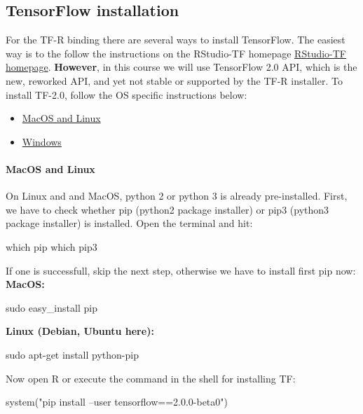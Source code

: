 \documentclass[a4paper,twoside]{tufte-book}\usepackage[]{graphicx}\usepackage[]{color}
\begin{document}
\subsection{TensorFlow installation}
For the TF-R binding there are several ways to install TensorFlow. 
%
The easiest way is to the follow the instructions on the RStudio-TF homepage \href{https://tensorflow.rstudio.com/tensorflow/articles/installation.html}{RStudio-TF homepage}.
%
\textbf{However}, in this course we will use TensorFlow 2.0 API, which is the new, reworked API, and yet not stable or supported by the TF-R installer.   
%
To install TF-2.0, follow the OS specific instructions below:
%
\begin{itemize}
\item \hyperref[Mac]{MacOS and Linux}
\item \hyperref[Windows]{Windows}
\end{itemize}

\paragraph{MacOS and Linux}\label{Mac} 
On Linux and and MacOS, python 2 or python 3 is already pre-installed.
%
First, we have to check whether pip (python2 package installer) or pip3 (python3 package installer) is installed. 
%
Open the terminal and hit:
\begin{Schunk}
\begin{Sinput}
which pip 
which pip3
\end{Sinput}
\end{Schunk}
If one is successfull, skip the next step, otherwise we have to install first pip now:
%
\textbf{MacOS: }
\begin{Schunk}
\begin{Sinput}
sudo easy_install pip
\end{Sinput}
\end{Schunk}
%

\textbf{Linux (Debian, Ubuntu here): }
\begin{Schunk}
\begin{Sinput}
sudo apt-get install python-pip
\end{Sinput}
\end{Schunk}
%
Now open R or execute the command in the shell for installing TF:
\begin{Schunk}
\begin{Sinput}
system("pip install --user tensorflow==2.0.0-beta0")
\end{Sinput}
\end{Schunk}
\end{document}

